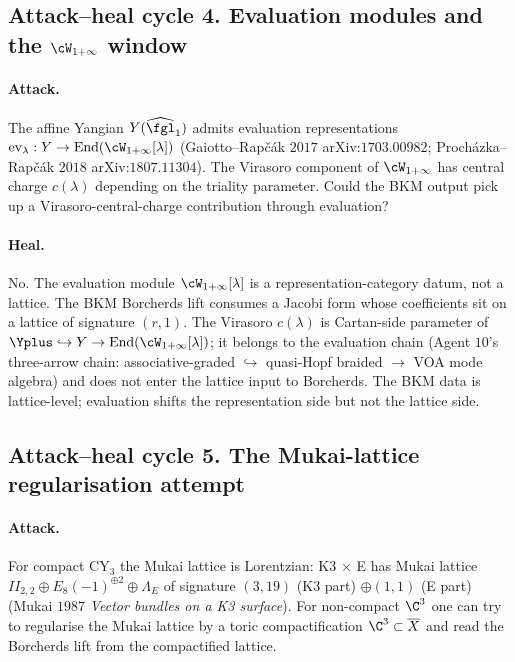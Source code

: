 \subsection*{Attack--heal cycle 4.  Evaluation modules and the $\cW_{1+\infty}$ window}

\paragraph{Attack.} The affine Yangian $Y(\widehat{\fgl}_1)$ admits
evaluation representations $\mathrm{ev}_\lambda : Y \to
\mathrm{End}(\cW_{1+\infty}[\lambda])$ (Gaiotto--Rap\v{c}\'ak
$2017$ arXiv:$1703.00982$; Proch\'azka--Rap\v{c}\'ak $2018$
arXiv:$1807.11304$). The Virasoro component of
$\cW_{1+\infty}$ has central charge $c(\lambda)$ depending on
the triality parameter. Could the BKM output pick up a
Virasoro-central-charge contribution through evaluation?

\paragraph{Heal.} No. The evaluation module $\cW_{1+\infty}[\lambda]
$ is a representation-category datum, not a lattice. The BKM
Borcherds lift consumes a Jacobi form whose coefficients sit on a
lattice of signature $(r, 1)$. The Virasoro $c(\lambda)$ is
Cartan-side parameter of $\Yplus \hookrightarrow Y \to
\mathrm{End}(\cW_{1+\infty}[\lambda])$; it belongs to the
evaluation chain (Agent $10$'s three-arrow chain:
associative-graded $\hookrightarrow$ quasi-Hopf braided
$\to$ VOA mode algebra) and does not enter the lattice input to
Borcherds. The BKM data is lattice-level; evaluation shifts the
representation side but not the lattice side.

\subsection*{Attack--heal cycle 5.  The Mukai-lattice regularisation attempt}

\paragraph{Attack.} For compact CY$_3$ the Mukai lattice is
Lorentzian: K3 $\times$ E has Mukai lattice $II_{2, 2}
\oplus E_8(-1)^{\oplus 2} \oplus \Lambda_E$ of signature
$(3, 19)$ (K3 part) $\oplus (1, 1)$ (E part) (Mukai $1987$
\textit{Vector bundles on a K3 surface}). For non-compact $\C^3$
one can try to regularise the Mukai lattice by a toric
compactification $\C^3 \subset \overline{X}$ and read the Borcherds
lift from the compactified lattice.

